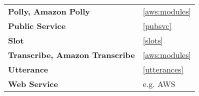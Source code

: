 \begin{flushleft}
\begin{tabular}{ll}
\textbf{Polly, Amazon Polly}&		\ref{aws:modules}\\
\textbf{Public Service}			&	\ref{pubsvc}\\
\textbf{Slot}				&		\ref{slots}\\

\textbf{Transcribe, Amazon Transcribe}	&		\ref{aws:modules}\\

\textbf{Utterance}			&		\ref{utterances}\\



\textbf{Web Service}			&		e.g. AWS\\







\end{tabular}
\end{flushleft}
